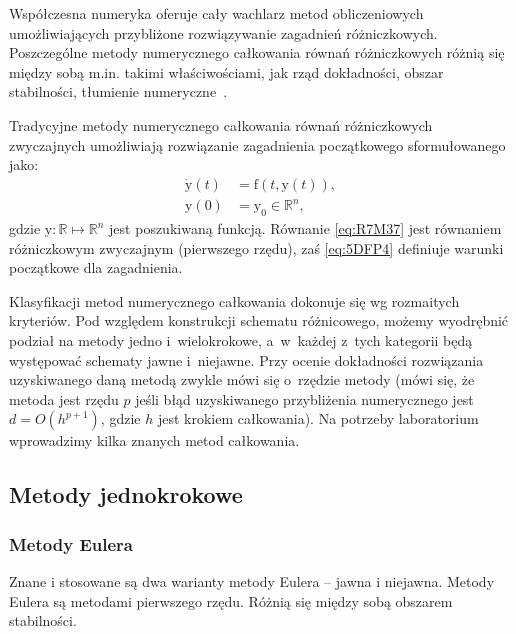 \documentclass[paper=a4,DIV=12]{lpas}
\newcommand{\brm}[1]{\bm{\mathrm{#1}}}
\begin{document}
\begin{appendices}
Współczesna numeryka oferuje cały wachlarz metod obliczeniowych umożliwiających
przybliżone rozwiązywanie zagadnień różniczkowych. Poszczególne metody
numerycznego całkowania równań różniczkowych różnią się między sobą m.in.
takimi właściwościami, jak rząd dokładności, obszar stabilności, tłumienie
numeryczne~\cite{asher&petzold:1998:computer-methods}.

Tradycyjne metody numerycznego całkowania równań różniczkowych zwyczajnych
umożliwiają rozwiązanie zagadnienia początkowego sformułowanego jako:
\begin{subequations}
\label{eq:L8KAD}
\begin{align}
  \dot{\brm{y}}\left(t\right) &= \brm{f}\left(t, \brm{y}(t)\right),
  \label{eq:R7M37}
  \\
  \brm{y}\left(0\right) &= \brm{y}_0 \in \mathbb{R}^n,
  \label{eq:5DFP4}
\end{align}
\end{subequations}
gdzie $\brm{y}: \mathbb{R} \mapsto \mathbb{R}^n$ jest poszukiwaną funkcją.
Równanie \eqref{eq:R7M37} jest równaniem różniczkowym zwyczajnym (pierwszego
rzędu), zaś \eqref{eq:5DFP4} definiuje warunki początkowe dla zagadnienia.

Klasyfikacji metod numerycznego całkowania dokonuje się wg rozmaitych
kryteriów. Pod względem konstrukcji schematu różnicowego, możemy wyodrębnić
podział na metody jedno i~wielokrokowe, a~w~każdej z~tych kategorii będą
występować schematy jawne i~niejawne. Przy ocenie dokładności rozwiązania
uzyskiwanego daną metodą zwykle mówi się o~rzędzie metody (mówi się, że metoda
jest rzędu $p$ jeśli błąd uzyskiwanego przybliżenia numerycznego jest $d =
O(h^{p+1})$, gdzie $h$ jest krokiem całkowania). Na potrzeby laboratorium
wprowadzimy kilka znanych metod całkowania.

\subsection{Metody jednokrokowe}
\label{sec:5BIFZ}

\subsubsection{Metody Eulera}
\label{sec:AN1EA}

Znane i stosowane są dwa warianty metody Eulera -- jawna i niejawna. Metody
Eulera są metodami pierwszego rzędu. Różnią się między sobą obszarem
stabilności.


\end{appendices}
\end{document}
